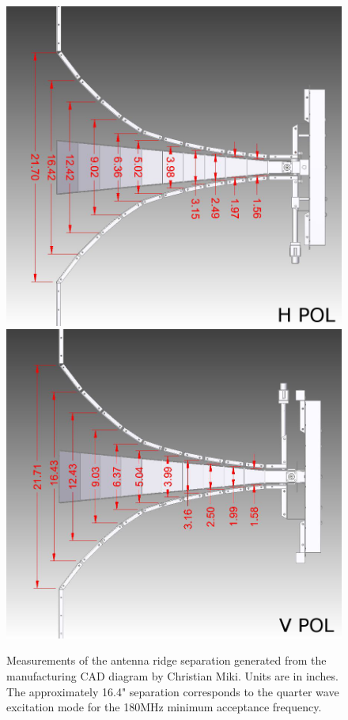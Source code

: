 \begin{figure}
\centering
	\includegraphics[height=0.45\textheight]{figures/SEAVEY_H_RIDGE}
	\includegraphics[height=0.45\textheight]{figures/SEAVEY_V_RIDGE}
	\caption{Measurements of the antenna ridge separation generated from the manufacturing CAD diagram by Christian Miki.  Units are in inches.  The approximately 16.4" separation corresponds to the quarter wave excitation mode for the 180MHz minimum acceptance frequency.  }
	\label{fig:antRidges}
\end{figure}	
	
